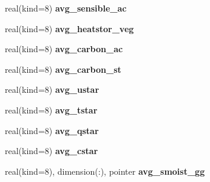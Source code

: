 \begin{DoxyCompactItemize}
\item 
\hypertarget{structrk4__coms_1_1rk4patchtype_a39fbc218ce0bd7904ce27c80b435f4ee}{
real(kind=8) {\bfseries avg\_\-sensible\_\-ac}}
\label{structrk4__coms_1_1rk4patchtype_a39fbc218ce0bd7904ce27c80b435f4ee}

\item 
\hypertarget{structrk4__coms_1_1rk4patchtype_ae1b42a8ea90797190a0c9c457e7234f5}{
real(kind=8) {\bfseries avg\_\-heatstor\_\-veg}}
\label{structrk4__coms_1_1rk4patchtype_ae1b42a8ea90797190a0c9c457e7234f5}

\item 
\hypertarget{structrk4__coms_1_1rk4patchtype_ad6e6550176dfb89feebfd941165e2449}{
real(kind=8) {\bfseries avg\_\-carbon\_\-ac}}
\label{structrk4__coms_1_1rk4patchtype_ad6e6550176dfb89feebfd941165e2449}

\item 
\hypertarget{structrk4__coms_1_1rk4patchtype_a410ab0421800f82d20802b590159b4d2}{
real(kind=8) {\bfseries avg\_\-carbon\_\-st}}
\label{structrk4__coms_1_1rk4patchtype_a410ab0421800f82d20802b590159b4d2}

\item 
\hypertarget{structrk4__coms_1_1rk4patchtype_ac625263218c21df43284e09fa81f7bd7}{
real(kind=8) {\bfseries avg\_\-ustar}}
\label{structrk4__coms_1_1rk4patchtype_ac625263218c21df43284e09fa81f7bd7}

\item 
\hypertarget{structrk4__coms_1_1rk4patchtype_a1744620bbd22622e4242381ac4a2f090}{
real(kind=8) {\bfseries avg\_\-tstar}}
\label{structrk4__coms_1_1rk4patchtype_a1744620bbd22622e4242381ac4a2f090}

\item 
\hypertarget{structrk4__coms_1_1rk4patchtype_ab76b9f2638d3d15f8a111beb65088bcd}{
real(kind=8) {\bfseries avg\_\-qstar}}
\label{structrk4__coms_1_1rk4patchtype_ab76b9f2638d3d15f8a111beb65088bcd}

\item 
\hypertarget{structrk4__coms_1_1rk4patchtype_adf42c712fb13a78da316ca3acbff0910}{
real(kind=8) {\bfseries avg\_\-cstar}}
\label{structrk4__coms_1_1rk4patchtype_adf42c712fb13a78da316ca3acbff0910}

\item 
\hypertarget{structrk4__coms_1_1rk4patchtype_a1b16039ce0441a945d2c3d94af0e43d6}{
real(kind=8), dimension(:), pointer {\bfseries avg\_\-smoist\_\-gg}}
\label{structrk4__coms_1_1rk4patchtype_a1b16039ce0441a945d2c3d94af0e43d6}


\end{DoxyCompactItemize}
